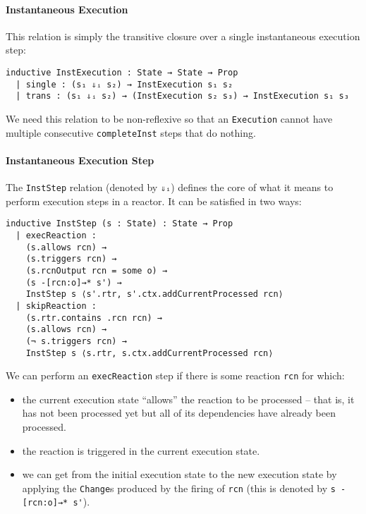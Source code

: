 \paragraph{Instantaneous Execution}

This relation is simply the transitive closure over a single instantaneous execution step:

\begin{lstlisting}
inductive InstExecution : State → State → Prop 
  | single : (s₁ ⇓ᵢ s₂) → InstExecution s₁ s₂
  | trans : (s₁ ⇓ᵢ s₂) → (InstExecution s₂ s₃) → InstExecution s₁ s₃
\end{lstlisting}

We need this relation to be non-reflexive so that an \lstinline{Execution} cannot have multiple consecutive \lstinline{completeInst} steps that do nothing.

\paragraph{Instantaneous Execution Step}
\label{par:inst-exec-step}

The \lstinline{InstStep} relation (denoted by \lstinline{⇓ᵢ}) defines the core of what it means to perform execution steps in a reactor.
It can be satisfied in two ways:

\begin{lstlisting}
inductive InstStep (s : State) : State → Prop 
  | execReaction : 
    (s.allows rcn) →
    (s.triggers rcn) →
    (s.rcnOutput rcn = some o) →
    (s -[rcn:o]→* s') →
    InstStep s ⟨s'.rtr, s'.ctx.addCurrentProcessed rcn⟩
  | skipReaction :
    (s.rtr.contains .rcn rcn) →
    (s.allows rcn) →
    (¬ s.triggers rcn) →
    InstStep s ⟨s.rtr, s.ctx.addCurrentProcessed rcn⟩
\end{lstlisting}

We can perform an \lstinline{execReaction} step if there is some reaction \lstinline{rcn} for which:

\begin{itemize}
  \item the current execution state ``allows'' the reaction to be processed -- that is, it has not been processed yet but all of its dependencies have already been processed.
  \item the reaction is triggered in the current execution state.
  \item we can get from the initial execution state to the new execution state by applying the \lstinline{Change}s produced by the firing of \lstinline{rcn} (this is denoted by \lstinline{s -[rcn:o]→* s'}).
\end{itemize}

